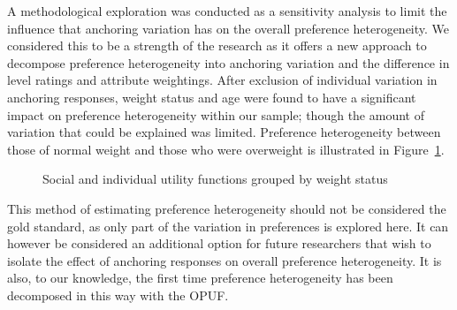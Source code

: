\documentclass[
  number,
  preprint]{elsarticle}
\begin{document}
A methodological exploration was conducted as a sensitivity analysis to
limit the influence that anchoring variation has on the overall
preference heterogeneity. We considered this to be a strength of the
research as it offers a new approach to decompose preference
heterogeneity into anchoring variation and the difference in level
ratings and attribute weightings. After exclusion of individual
variation in anchoring responses, weight status and age were found to
have a significant impact on preference heterogeneity within our sample;
though the amount of variation that could be explained was limited.
Preference heterogeneity between those of normal weight and those who
were overweight is illustrated in Figure~\ref{fig-weight}.

\begin{figure}


\caption{\label{fig-weight}Social and individual utility functions
grouped by weight status}

\end{figure}%

This method of estimating preference heterogeneity should not be
considered the gold standard, as only part of the variation in
preferences is explored here. It can however be considered an additional
option for future researchers that wish to isolate the effect of
anchoring responses on overall preference heterogeneity. It is also, to
our knowledge, the first time preference heterogeneity has been
decomposed in this way with the OPUF.
\end{document}
